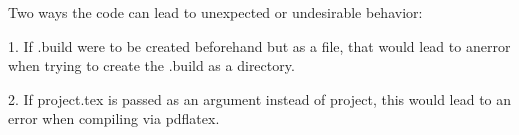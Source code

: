 \documentclass[12 pt]{article}
\begin{document}
\vspace{5mm}
\noindent Two ways the code can lead to unexpected or undesirable behavior:

1. If .build were to be created beforehand but as a file, that would lead to anerror when trying to create the .build as a directory.

2. If project.tex is passed as an argument instead of project, this would lead to an error when compiling via pdflatex. 
\end{document}
